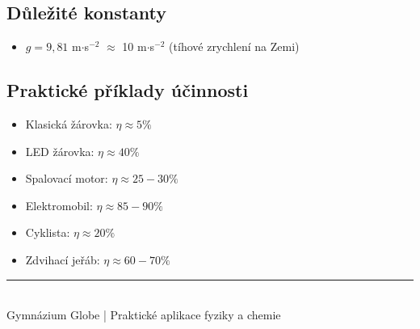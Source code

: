 \documentclass[a4paper,11pt]{article}
\begin{document}
\subsection{Důležité konstanty}

\begin{notebox}
\begin{itemize}
    \item $g = 9{,}81$ m$\cdot$s$^{-2}$ $\approx$ 10 m$\cdot$s$^{-2}$ (tíhové zrychlení na Zemi)
\end{itemize}
\end{notebox}

\subsection{Praktické příklady účinnosti}

\begin{notebox}
\begin{itemize}
    \item Klasická žárovka: $\eta \approx 5\%$
    \item LED žárovka: $\eta \approx 40\%$
    \item Spalovací motor: $\eta \approx 25-30\%$
    \item Elektromobil: $\eta \approx 85-90\%$
    \item Cyklista: $\eta \approx 20\%$
    \item Zdvihací jeřáb: $\eta \approx 60-70\%$
\end{itemize}
\end{notebox}

\vfill

\begin{center}
\rule{0.8\textwidth}{0.5pt}\\[0.3cm]
{\small Gymnázium Globe | Praktické aplikace fyziky a chemie}
\end{center}
\end{document}

